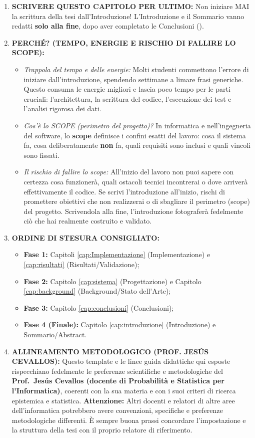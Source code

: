 \begin{enumerate}
    \item \textbf{SCRIVERE QUESTO CAPITOLO PER ULTIMO:} Non iniziare MAI la scrittura della tesi dall'Introduzione! L'Introduzione e il Sommario vanno redatti \textbf{solo alla fine}, dopo aver completato le Conclusioni ().
    \item \textbf{PERCHÉ? (TEMPO, ENERGIE E RISCHIO DI FALLIRE LO SCOPE):}
    \begin{itemize}
        \item \emph{Trappola del tempo e delle energie:} Molti studenti commettono l'errore di iniziare dall'introduzione, spendendo settimane a limare frasi generiche. Questo consuma le energie migliori e lascia poco tempo per le parti cruciali: l'architettura, la scrittura del codice, l'esecuzione dei test e l'analisi rigorosa dei dati.
        \item \emph{Cos'è lo SCOPE (perimetro del progetto)?} In informatica e nell'ingegneria del software, lo \textbf{scope} definisce i confini esatti del lavoro: cosa il sistema fa, cosa deliberatamente \textbf{non} fa, quali requisiti sono inclusi e quali vincoli sono fissati.
        \item \emph{Il rischio di fallire lo scope:} All'inizio del lavoro non puoi sapere con certezza cosa funzionerà, quali ostacoli tecnici incontrerai o dove arriverà effettivamente il codice. Se scrivi l'introduzione all'inizio, rischi di promettere obiettivi che non realizzerai o di sbagliare il perimetro (scope) del progetto. Scrivendola alla fine, l'introduzione fotograferà fedelmente ciò che hai realmente costruito e validato.
    \end{itemize}
    \item \textbf{ORDINE DI STESURA CONSIGLIATO:}
    \begin{itemize}
        \item \textbf{Fase 1:} Capitoli \ref{cap:Implementazione} (Implementazione) e \ref{cap:risultati} (Risultati/Validazione);
        \item \textbf{Fase 2:} Capitolo \ref{cap:sistema} (Progettazione) e Capitolo \ref{cap:background} (Background/Stato dell'Arte);
        \item \textbf{Fase 3:} Capitolo \ref{cap:conclusioni} (Conclusioni);
        \item \textbf{Fase 4 (Finale):} Capitolo \ref{cap:introduzione} (Introduzione) e Sommario/Abstract.
    \end{itemize}
    \item \textbf{ALLINEAMENTO METODOLOGICO (PROF. JESÚS CEVALLOS):}
    Questo template e le linee guida didattiche qui esposte rispecchiano fedelmente le preferenze scientifiche e metodologiche del \textbf{Prof.~Jesús Cevallos (docente di Probabilità e Statistica per l'Informatica)}, coerenti con la sua materia e con i suoi criteri di ricerca epistemica e statistica. 
    \textbf{Attenzione:} Altri docenti e relatori di altre aree dell'informatica potrebbero avere convenzioni, specifiche e preferenze metodologiche differenti. È sempre buona prassi concordare l'impostazione e la struttura della tesi con il proprio relatore di riferimento.
\end{enumerate}

